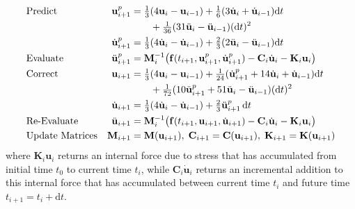 \begin{subequations}
    \notag
    \begin{align}
    \mbox{} & \text{Predict} &
    \mathbf{u}_{i+1}^p & = \tfrac{1}{3} (
    4 \mathbf{u}_i - \mathbf{u}_{i-1} ) + 
    \tfrac{1}{6} ( 3 \dot{\mathbf{u}}_i + 
    \dot{\mathbf{u}}_{i-1} ) \mathrm{d}t \\ & & & \qquad + 
    \tfrac{1}{36} ( 31 \ddot{\mathbf{u}}_i - 
    \ddot{\mathbf{u}}_{i-1} ) ( \mathrm{d}t )^2 \\
    \mbox{} & &
    \dot{\mathbf{u}}_{i+1}^p & = \tfrac{1}{3} 
    ( 4 \dot{\mathbf{u}}_i - \dot{\mathbf{u}}_{i-1} ) + 
    \tfrac{2}{3} ( 2 \ddot{\mathbf{u}}_i - \ddot{\mathbf{u}}_{i-1} ) \mathrm{d}t \\
    \mbox{} & \text{Evaluate} &
    \ddot{\mathbf{u}}^p_{i+1} & = \mathbf{M}^{-1}_i \bigl( 
    \mathbf{f}(t_{i+1} , \mathbf{u}_{i+1}^p , \dot{\mathbf{u}}_{i+1}^p ) - 
    \mathbf{C}_i \dot{\mathbf{u}}_i - \mathbf{K}_i \mathbf{u}_i \bigr) \\
    \mbox{} & \text{Correct} & 
    \mathbf{u}_{i+1} & = \tfrac{1}{3} (
    4  \mathbf{u}_i - \mathbf{u}_{i-1} ) +
    \tfrac{1}{24} ( \dot{\mathbf{u}}^p_{i+1} +
    14 \dot{\mathbf{u}}_i + \dot{\mathbf{u}}_{i-1} ) \mathrm{d}t  \\
    \mbox{} & & & \qquad +
    \tfrac{1}{72} ( 10 \ddot{\mathbf{u}}^p_{i+1} + 
    51 \ddot{\mathbf{u}}_i - \ddot{\mathbf{u}}_{i-1} ) ( \mathrm{d}t )^2 \\ 
    \mbox{} & &
    \dot{\mathbf{u}}_{i+1} & = \tfrac{1}{3} 
    ( 4 \dot{\mathbf{u}}_i - \dot{\mathbf{u}}_{i-1} ) + 
    \tfrac{2}{3} \ddot{\mathbf{u}}^p_{i+1} \, \mathrm{d}t \\
    \mbox{} & \text{Re-Evaluate} & 
    \ddot{\mathbf{u}}_{i+1} & = \mathbf{M}^{-1}_i \bigl( 
    \mathbf{f}( t_{i+1} , \mathbf{u}_{i+1} , \dot{\mathbf{u}}_{i+1} ) - 
    \mathbf{C}_i \dot{\mathbf{u}}_i - \mathbf{K}_i \mathbf{u}_i \bigr) \\
    \mbox{} & \text{Update Matrices} & 
    \mathbf{M}_{i+1} & = \mathbf{M} ( \mathbf{u}_{i+1} ) , \;
    \mathbf{C}_{i+1} = \mathbf{C} ( \mathbf{u}_{i+1} ) , \;
    \mathbf{K}_{i+1} = \mathbf{K} ( \mathbf{u}_{i+1} )
    \end{align}
\end{subequations}
where $\mathbf{K}_i \mathbf{u}_i$ returns an internal force due to stress that has accumulated from initial time $t_0$ to current time $t_i$, while $\mathbf{C}_i \dot{\mathbf{u}}_i$ returns an incremental addition to this internal force that has accumulated between current time $t_i$ and future time $t_{i+1} = t_i + \mathrm{d}t$.

